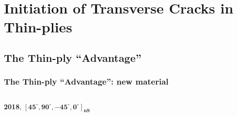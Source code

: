 \documentclass[first,firstsupp,lastsupp,last,hyperref,table]{ETHclass}
\begin{document}
\section{Initiation of Transverse Cracks in Thin-plies}

\subsection{The Thin-ply ``Advantage''}

\begin{frame}
\frametitle{\vspace{0.3cm}\small The Thin-ply ``Advantage'': new material}
\vspace{-0.8cm}
\centering
\begin{columns}[t]
\begin{column}{0.5\textwidth}
\centering
\tiny
\textbf{2018}, $\mathbf{\left[45^{\circ}, 90^{\circ},-45^{\circ},0^{\circ}\right]_{nS}}$
\end{column}
\begin{column}{0.5\textwidth}
\centering


\end{column}
\end{columns}
\end{frame}
\end{document}
